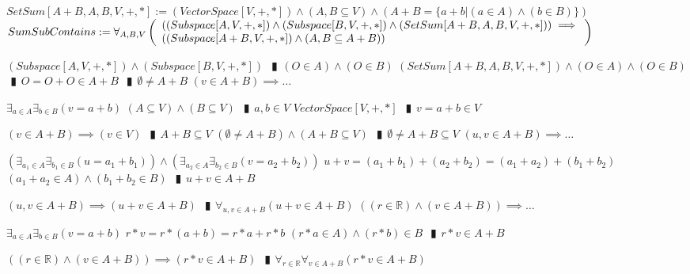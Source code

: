 \documentclass{book}
\newcommand{\abr}{:=}
\newcommand{\pipe}{$\phantom{(}\vrectangleblack\phantom{)}$}
\begin{document}
\begin{shaded} %
  $SetSum[A + B, A, B, V, +, *] \abr (VectorSpace[V, +, *]) \land (A, B \subseteq V) \land (A + B = \{a + b | (a \in A) \land (b \in B)\})$ \\

  $SumSubContains \abr \forall_{A, B, V}\left(\begin{array}{ll}
    ((Subspace[A, V, +, *]) \land (Subspace[B, V, +, *]) \land (SetSum[A + B, A, B, V, +, *])) \hfill \implies \hfill \\
    ((Subspace[A + B, V, + ,*]) \land (A, B \subseteq A + B))
  \end{array}\right)$
  \begin{enumerate}
    \lit $(Subspace[A, V, +, *]) \land (Subspace[B, V, +, *])$ \pipe $(O \in A) \land (O \in B)$
    \lit $(SetSum[A + B, A, B, V, +, *]) \land (O \in A) \land (O \in B)$ \pipe $O = O + O \in A + B$ \pipe $\emptyset \neq A + B$
    \lit $(v \in A + B) \implies \ldots$
    \begin{enumerate}
      \lit $\exists_{a \in A} \exists_{b \in B}(v = a + b)$
      \lit $(A \subseteq V) \land (B \subseteq V)$ \pipe $a, b \in V$
      \lit $VectorSpace[V, +, *]$ \pipe $v = a + b \in V$
    \end{enumerate}
    \lit $(v \in A + B) \implies (v \in V)$ \pipe $A + B \subseteq V$
    \lit $(\emptyset \neq A + B) \land (A + B \subseteq V)$ \pipe $\emptyset \neq A + B \subseteq V$
    \lit $(u, v \in A + B) \implies \ldots$
    \begin{enumerate}
      \lit $(\exists_{a_1 \in A} \exists_{b_1 \in B}(u = a_1 + b_1)) \land (\exists_{a_2 \in A} \exists_{b_2 \in B}(v = a_2 + b_2))$
      \lit $u + v = (a_1 + b_1) + (a_2 + b_2) = (a_1 + a_2) + (b_1 + b_2)$
      \lit $(a_1 + a_2 \in A) \land (b_1 + b_2 \in B)$ \pipe $u + v \in A + B$
    \end{enumerate}
    \lit $(u, v \in A + B) \implies (u + v \in A + B)$ \pipe $\forall_{u, v \in A + B}(u + v \in A + B)$
    \lit $((r \in \mathbb{R}) \land (v \in A + B)) \implies \ldots$
    \begin{enumerate}
      \lit $\exists_{a \in A} \exists_{b \in B}(v = a + b)$
      \lit $r * v = r * (a + b) = r * a + r * b$
      \lit $(r * a \in A) \land (r * b) \in B$ \pipe $r * v \in A + B$
    \end{enumerate}
    \lit $((r \in \mathbb{R}) \land (v \in A + B)) \implies (r * v \in A + B)$ \pipe $\forall_{r \in \mathbb{R}} \forall_{v \in A + B}(r * v \in A + B)$

\end{enumerate}
\end{shaded}
\end{document}
